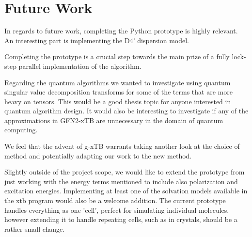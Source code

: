 \chapter{Future Work}\label{sec:future}
In regards to future work, completing the Python prototype is highly relevant. 
An interesting part is implementing the D4' dispersion model. 

Completing the prototype is a crucial step towards the main prize of a fully lock-step parallel implementation of the algorithm. 

Regarding the quantum algorithms we wanted to investigate using quantum singular value decomposition transforms for some of the terms that are more heavy on tensors. This would be a good thesis topic for anyone interested in quantum algorithm design. It would also be interesting to investigate if any of the approximations in GFN2-xTB are unnecessary in the domain of quantum computing.

We feel that the advent of g-xTB warrants taking another look at the choice of method and potentially adapting our work to the new method. 

Slightly outside of the project scope, we would like to extend the prototype from just working with the energy terms mentioned to include also polarization and excitation energies. Implementing at least one of the solvation models available in the xtb program would also be a welcome addition. The current prototype handles everything as one 'cell', perfect for simulating individual molecules, however extending it to handle repeating cells, such as in crystals, should be a rather small change. 
